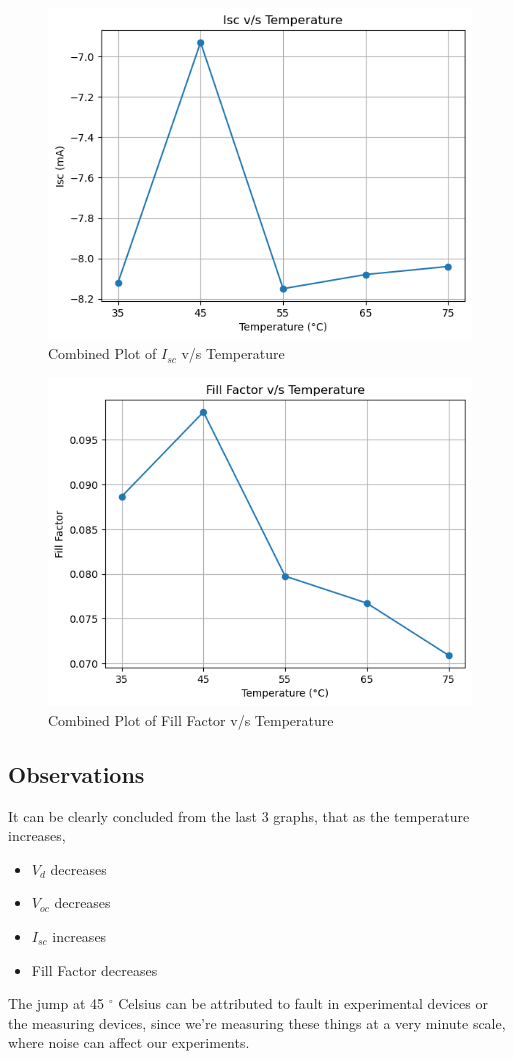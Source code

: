 \documentclass[a4paper]{article}
\begin{document}
\begin{figure}[h!]
    \centering
    \includegraphics[width=0.7\linewidth]{Lab_5/Post_Lab/V_sc_vs_Temperature.png}
    \caption{Combined Plot of $I_{sc}$ v/s Temperature}
\end{figure}
\newpage
\begin{figure}[h!]
    \centering
    \includegraphics[width=0.7\linewidth]{Lab_5/Post_Lab/Fill_Factor_vs_Temperature.png}
    \caption{Combined Plot of Fill Factor v/s Temperature}
\end{figure}

\subsection{Observations}
It can be clearly concluded from the last 3 graphs, that as the temperature increases, 
\begin{itemize}
    \item $V_d$ decreases
    \item $V_{oc}$ decreases
    \item $I_{sc}$ increases
    \item Fill Factor decreases
\end{itemize}
The jump at 45 $^{\circ}$ Celsius can be attributed to fault in experimental devices or the measuring devices, since we're measuring these things at a very minute scale, where noise can affect our experiments.
\end{document}
